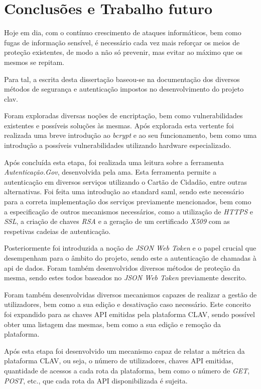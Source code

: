 \chapter{Conclusões e Trabalho futuro}

Hoje em dia, com o contínuo crescimento de ataques informáticos, bem como fugas de informação sensível, é necessário cada vez mais reforçar os meios de proteção existentes, de modo a não só prevenir, mas evitar ao máximo que os mesmos se repitam.

Para tal, a escrita desta dissertação baseou-se na documentação dos diversos métodos de segurança e autenticação impostos no desenvolvimento do projeto \gls{clav}.

Foram exploradas diversas noções de encriptação, bem como vulnerabilidades existentes e possíveis soluções às mesmas. Após explorada esta vertente foi realizada uma breve introdução ao \emph{bcrypt} e ao seu funcionamento, bem como uma introdução a possíveis vulnerabilidades utilizando hardware especializado.

Após concluída esta etapa, foi realizada uma leitura sobre a ferramenta \emph{Autenticação.Gov}, desenvolvida pela \gls{ama}. Esta ferramenta permite a autenticação em diversos serviços utilizando o Cartão de Cidadão, entre outras alternativas. Foi feita uma introdução ao standard \gls{saml}, sendo este necessário para a correta implementação dos serviços previamente mencionados, bem como a especificação de outros mecanismos necessários, como a utilização de \emph{HTTPS} e \emph{SSL}, a criação de chaves \emph{RSA} e a geração de um certificado \emph{X509} com as respetivas cadeias de autenticação.

Posteriormente foi introduzida a noção de \emph{JSON Web Token} e o papel crucial que desempenham para o âmbito do projeto, sendo este a autenticação de chamadas à \gls{api} de dados. Foram também desenvolvidos diversos métodos de proteção da mesma, sendo estes todos baseados no \emph{JSON Web Token} previamente descrito.

Foram também desenvolvidas diversos mecanismos capazes de realizar a gestão de utilizadores, bem como a sua edição e desativação caso necessário. Este conceito foi expandido para as chaves API emitidas pela plataforma CLAV, sendo possível obter uma listagem das mesmas, bem como a sua edição e remoção da plataforma.

Após esta etapa foi desenvolvido um mecanismo capaz de relatar a métrica da plataforma CLAV, ou seja, o número de utilizadores, chaves API emitidas, quantidade de acessos a cada rota da plataforma, bem como o número de \emph{GET}, \emph{POST}, etc., que cada rota da API disponibilizada é sujeita.

